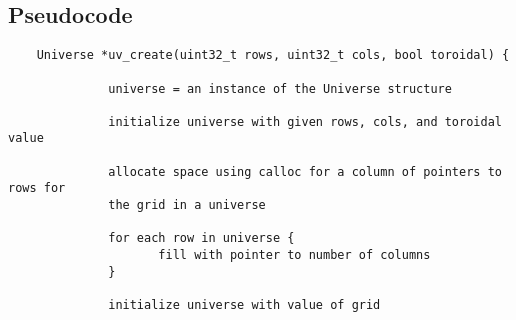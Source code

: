 \documentclass[11pt]{article}
\begin{document}
\subsection{Pseudocode}
\begin{verbatim}
    Universe *uv_create(uint32_t rows, uint32_t cols, bool toroidal) {
    
              universe = an instance of the Universe structure 
              
              initialize universe with given rows, cols, and toroidal value
              
              allocate space using calloc for a column of pointers to rows for 
              the grid in a universe
              
              for each row in universe {
                     fill with pointer to number of columns
              }
              
              initialize universe with value of grid
              

\end{verbatim}
\end{document}
